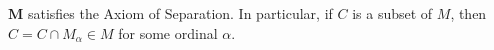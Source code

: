 $\mathbf{M}$ satisfies the Axiom of Separation. In particular, if $C$ is a subset of $M$, then $C = C \cap M_\alpha \in M$ for some ordinal $\alpha$.
